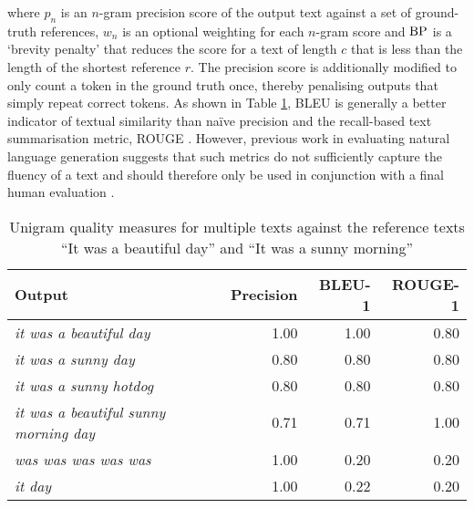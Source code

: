 \documentclass[12pt,a4paper]{article}
\begin{document}
\vspace{4mm}
\noindent where $p_n$ is an $n$-gram precision score of the output text against a set of ground-truth references, $w_n$ is an optional weighting for each $n$-gram score and $\textnormal{BP}$ is a `brevity penalty' that reduces the score for a text of length $c$ that is less than the length of the shortest reference $r$. The precision score is additionally modified to only count a token in the ground truth once, thereby penalising outputs that simply repeat correct tokens. As shown in Table \ref{bleu}, BLEU is generally a better indicator of textual similarity than na\"ive precision and the recall-based text summarisation metric, ROUGE \cite{rouge}. However, previous work in evaluating natural language generation suggests that such metrics do not sufficiently capture the fluency of a text and should therefore only be used in conjunction with a final human evaluation \cite{evalall}.
\begin{table}[htp]
\vspace{2mm}
\centering
  \caption{Unigram quality measures for multiple texts against the reference texts ``It was a beautiful day'' and ``It was a sunny morning''}\label{bleu}
  \vspace{2pt}
  \begin{tabular}{lrrr}
      \toprule
      Output & Precision & BLEU-1 & ROUGE-1  \\
     \midrule
      \textit{ it was a beautiful day} & 1.00 & 1.00 & 0.80 \\
      \textit{ it was a sunny day} & 0.80 & 0.80 & 0.80\\
      \textit{ it was a sunny hotdog} & 0.80 & 0.80 & 0.80\\
      \textit{ it was a beautiful sunny morning day} & 0.71 & 0.71 & 1.00 \\
      \textit{ was was was was was} & 1.00 & 0.20 & 0.20\\
      \textit{ it day} & 1.00 & 0.22 & 0.20\\
      \bottomrule
          \hline
  \end{tabular}
\end{table}
\end{document}
